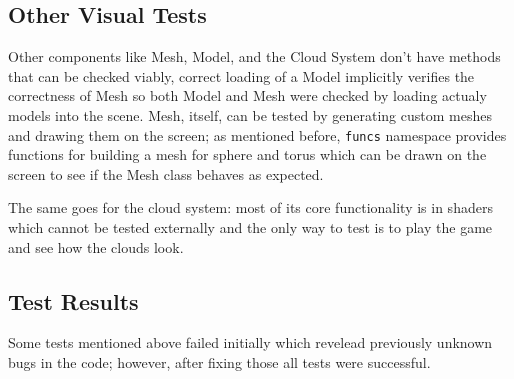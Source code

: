 \subsection{Other Visual Tests}
Other components like Mesh, Model, and the Cloud System don't have methods that can be checked viably, correct loading of a Model implicitly verifies the correctness of Mesh so both Model and Mesh were checked by loading actualy models into the scene. Mesh, itself, can be tested by generating custom meshes and drawing them on the screen; as mentioned before, \texttt{funcs} namespace provides functions for building a mesh for sphere and torus which can be drawn on the screen to see if the Mesh class behaves as expected.

The same goes for the cloud system: most of its core functionality is in shaders which cannot be tested externally and the only way to test is to play the game and see how the clouds look.

\subsection{Test Results}
Some tests mentioned above failed initially which revelead previously unknown bugs in the code; however, after fixing those all tests were successful.
